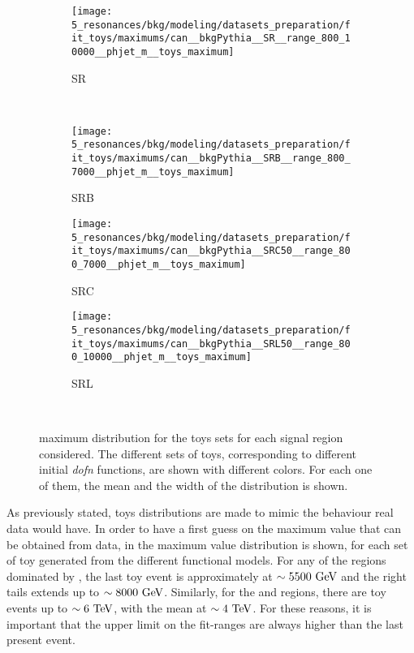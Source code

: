 \begin{figure}[ht!]
    \centering
    \begin{subfigure}[h]{0.32\linewidth}
        \centering
        \texttt{[image: 5\_resonances/bkg/modeling/datasets\_preparation/fit\_toys/maximums/can\_\_bkgPythia\_\_SR\_\_range\_800\_10000\_\_phjet\_m\_\_toys\_maximum]}
        \caption{SR}
    \end{subfigure}\\
    \begin{subfigure}[h]{0.32\linewidth}
        \centering
        \texttt{[image: 5\_resonances/bkg/modeling/datasets\_preparation/fit\_toys/maximums/can\_\_bkgPythia\_\_SRB\_\_range\_800\_7000\_\_phjet\_m\_\_toys\_maximum]}
        \caption{SRB}
    \end{subfigure}
    \begin{subfigure}[h]{0.32\linewidth}
        \centering
        \texttt{[image: 5\_resonances/bkg/modeling/datasets\_preparation/fit\_toys/maximums/can\_\_bkgPythia\_\_SRC50\_\_range\_800\_7000\_\_phjet\_m\_\_toys\_maximum]}
        \caption{SRC}
    \end{subfigure}
    \begin{subfigure}[h]{0.32\linewidth}
        \centering
        \texttt{[image: 5\_resonances/bkg/modeling/datasets\_preparation/fit\_toys/maximums/can\_\_bkgPythia\_\_SRL50\_\_range\_800\_10000\_\_phjet\_m\_\_toys\_maximum]}
        \caption{SRL}
    \end{subfigure}\\
    \caption{\myj maximum distribution for the toys sets for each signal region considered. The different sets of toys, corresponding to different initial \textit{dofn} functions, are shown with different colors. For each one of them, the mean and the width of the distribution is shown.}
    \label{fig:bkg:modeling:preparation:toys:toys_maximums}
\end{figure}

As previously stated, toys distributions are made to mimic the behaviour real data would have. In order to have a first guess on the maximum \myj value that can be obtained from data, in \Fig{\ref{fig:bkg:modeling:preparation:toys:toys_maximums}} the maximum \myj value distribution is shown, for each set of toy generated from the different functional models. For any of the regions dominated by \ljets, the last toy event is approximately at \(\sim 5500~\text{GeV}\) and the right tails extends up to \(\sim 8000~\text{GeV}\). Similarly, for the \cjets and \bjets regions, there are toy events up to \(\sim 6~\text{TeV}\), with the mean at \(\sim 4~\text{TeV}\). For these reasons, it is important that the upper limit on the fit-ranges are always higher than the last present event.

